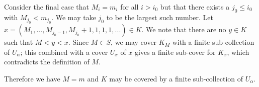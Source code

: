 Consider the final case that \(M_i = m_i\) for all \(i > i_0\) but that there exists a \(j_0 \leq i_0\) with
\(M_{j_0} < m_{j_0}\). We may take \(j_0\) to be the largest such number. Let 
\(x = (M_1, ..., M_{j_0 - 1}, M_{j_0} + 1, 1, 1, 1, ...) \in K\). We note that there are no \(y \in K\) such
that \(M < y < x\). Since \(M \in S\), we may cover \(K_M\) with a finite sub-collection of \(U_\alpha\); this
combined with a cover \(U_x\) of \(x\) gives a finite sub-cover for \(K_x\), which contradicts the
definition of \(M\). 

Therefore we have \(M = m\) and \(K\) may be covered by a finite sub-collection of \(U_\alpha\).

